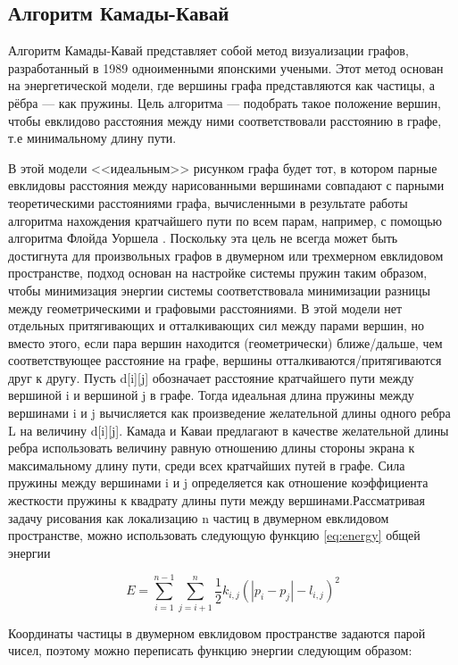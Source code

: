 \documentclass[14pt, russian]{scrartcl}
\begin{document}
\subsection{Алгоритм Камады-Кавай}

Алгоритм Камады-Кавай\cite{KK} представляет собой метод визуализации графов, разработанный в 1989 одноименными японскими учеными.
Этот метод основан на энергетической модели, где вершины графа представляются как частицы, а рёбра --- как пружины.
Цель алгоритма --- подобрать такое положение вершин, чтобы евклидово расстояния между ними соответствовали расстоянию в графе, т.е минимальному длину пути.

В этой модели <<идеальным>> рисунком графа будет тот, в котором парные евклидовы расстояния между нарисованными вершинами совпадают с парными теоретическими расстояниями графа, вычисленными в результате работы алгоритма нахождения кратчайшего пути по всем парам, например, с помощью алгоритма Флойда Уоршела \cite{FloydWarshall}.
Поскольку эта цель не всегда может быть достигнута для произвольных графов в двумерном или трехмерном евклидовом пространстве, подход основан на настройке системы пружин таким образом,
чтобы минимизация энергии системы соответствовала минимизации разницы между геометрическими и графовыми расстояниями. В этой модели нет отдельных притягивающих и отталкивающих сил между парами вершин, но вместо этого, если пара вершин находится (геометрически) ближе/дальше, чем соответствующее расстояние на графе, вершины отталкиваются/притягиваются друг к другу. Пусть d[i][j] обозначает расстояние кратчайшего пути между вершиной i и вершиной j в графе. Тогда идеальная длина пружины между вершинами i и j вычисляется как произведение желательной длины одного ребра L на величину d[i][j]. Камада и Каваи предлагают в качестве желательной длины ребра использовать величину равную отношению длины стороны экрана к максимальному длину пути, среди всех кратчайших путей в графе. Сила пружины между вершинами i и j определяется как отношение коэффициента жесткости пружины к квадрату длины пути между вершинами.Рассматривая задачу рисования как локализацию n частиц в двумерном евклидовом пространстве, можно использовать следующую функцию \ref{eq:energy} общей энергии 

\begin{equation}\label{eq:energy}
  E = \sum_{i = 1}^{n - 1}\sum_{j = i + 1}^{n}{\frac{1}{2}k_{i, j}(|p_i - p_j| - l_{i, j})^2}
\end{equation} 

Координаты частицы в двумерном евклидовом пространстве задаются парой чисел, поэтому можно переписать функцию энергии следующим образом:
\end{document}
